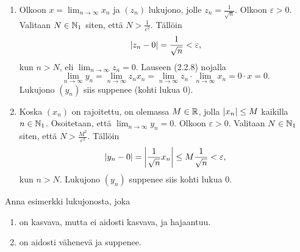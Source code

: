 \documentclass[11pt,a4paper]{amsart}
\begin{document}
\begin{solution}
\leavevmode\par
\begin{enumerate}[label=\alph*), nosep]
\item Olkoon \(x = \lim_{n \to \infty} x_n\) ja \((z_n)\) lukujono, jolle
  \(z_n = \frac{1}{\sqrt{n}}\). Olkoon \(\varepsilon > 0\). Valitaan \(N
  \in \NNone\)
  siten, että \(N > \frac{1}{\varepsilon^2}\). Tällöin
  \[
    \abs{z_n - 0} = \frac{1}{\sqrt{n}} < \varepsilon,
  \]
  kun \(n > N\), eli \(\lim_{n \to \infty} z_n = 0\). Lauseen (2.2.8) nojalla
  \[
    \lim_{n \to \infty} y_n = \lim_{n \to \infty} z_nx_n = \lim_{n
    \to \infty} z_n \cdot \lim_{n \to \infty} x_n = 0\cdot x = 0.
  \]
  Lukujono \((y_n)\) siis suppenee (kohti lukua \(0\)).

\item Koska \((x_n)\) on rajoitettu, on olemassa \(M \in \RR\), jolla
  \(\abs{x_n} \leq M\) kaikilla \(n \in \NNone\). Osoitetaan, että
  \(\lim_{n \to \infty} y_n = 0\). Olkoon \(\varepsilon > 0\). Valitaan
  \(N \in \NNone\) siten, että \(N > \frac{M^2}{\varepsilon^2}\). Tällöin
  \[
    \abs{y_n - 0} = \abs*{\frac{1}{\sqrt{n}}x_n} \leq
    M\frac{1}{\sqrt{n}} < \varepsilon,
  \]
  kun \(n > N\). Lukujono \((y_n)\) suppenee siis kohti lukua \(0\).
\end{enumerate}
\end{solution}

\begin{exercise}
Anna esimerkki lukujonosta, joka
\begin{enumerate}[label=\alph*), nosep]
\item on kasvava, mutta ei aidosti kasvava, ja hajaantuu.
\item on aidosti vähenevä ja suppenee.
\end{enumerate}
\end{exercise}
\end{document}
